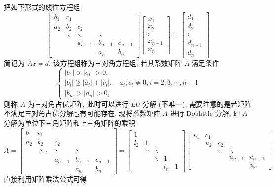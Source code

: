 把如下形式的线性方程组
$$
\left[\begin{array}{ccccc}
b_{1} & c_{1} & & & \\
a_{2} & b_{2} & c_{2} & & \\
& \ddots & \ddots & \ddots & \\
& & a_{n-1} & b_{n-1} & c_{n-1} \\
& & & a_{n} & b_{n}
\end{array}\right]\left[\begin{array}{c}
x_{1} \\
x_{2} \\
\vdots \\
x_{n-1} \\
x_{n}
\end{array}\right]=\left[\begin{array}{c}
d_{1} \\
d_{2} \\
\vdots \\
d_{n-1} \\
d_{n}
\end{array}\right]
$$
简记为 $ A x=d $, 该方程组称为三对角方程组, 若其系数矩阵 $ A $ 满足条件
$$
\left\{\begin{array}{l}
\left|b_{1}\right|>\left|c_{1}\right|>0, \\
\left|b_{i}\right| \geqslant\left|a_{i}\right|+\left|c_{i}\right|, \quad a_{i}, c_{i} \neq 0, i=2,3, \cdots, n-1 \\
\left|b_{n}\right|>\left|a_{n}\right|>0,
\end{array}\right.
$$
则称 $ A $ 为三对角占优矩阵, 此时可以进行 $ {LU} $ 分解 (不唯一), 需要注意的是若矩阵不满足三对角占优分解也有可能存在, 现将系数矩阵 $ A $ 进行 Doolittle 分解, 即 $ A $ 分解为单位下三角矩阵和上三角矩阵的乘积
$$
A=\left[\begin{array}{ccccc}
b_{1} & c_{1} & & & \\
a_{2} & b_{2} & c_{2} & & \\
& \ddots, & \ddots & \ddots & \\
& & a_{n-1} & b_{n-1} & c_{n-1} \\
& & & a_{n} & b_{n}
\end{array}\right]=\left[\begin{array}{ccccc}
1 & & & & \\
l_{2} & 1 & & & \\
& \ddots & \ddots & & \\
& & \ddots & 1 & \\
& & & l_{n} & 1
\end{array}\right]\left[\begin{array}{ccccc}
u_{1} & c_{1} & & & \\
& u_{2} & c_{2} & & \\
& & \ddots & \ddots & \\
& & & u_{n-1} & c_{n-1} \\
& & & & u_{n}
\end{array}\right]
$$
直接利用矩阵乘法公式可得


